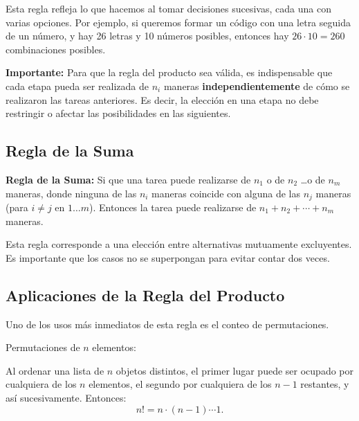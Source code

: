 Esta regla refleja lo que hacemos al tomar decisiones sucesivas, cada una con varias opciones. Por ejemplo, si queremos formar un código con una letra seguida de un número, y hay 26 letras y 10 números posibles, entonces hay $26 \cdot 10 = 260$ combinaciones posibles.

\medskip

\textbf{Importante:} Para que la regla del producto sea válida, es indispensable que cada etapa pueda ser realizada de $n_i$ maneras \textbf{independientemente} de cómo se realizaron las tareas anteriores. Es decir, la elección en una etapa no debe restringir o afectar las posibilidades en las siguientes.



\subsection*{Regla de la Suma}

\begin{definitionblock}{\textbf{Regla de la Suma:}} 
 Si que una tarea puede realizarse de $n_1$ o de $n_2$ \ldots o de $n_m$
  maneras, donde ninguna de las $n_i$ maneras coincide con alguna de las $n_j$
  maneras (para $i \neq j$ en $1\ldots m$). Entonces la tarea puede realizarse
  de $n_1 + n_2 + \cdots + n_m$ maneras.
\end{definitionblock}

Esta regla corresponde a una elección entre alternativas mutuamente excluyentes. Es importante que los casos no se superpongan para evitar contar dos veces.



\subsection{Aplicaciones de la Regla del Producto}

Uno de los usos más inmediatos de esta regla es el conteo de permutaciones.

\begin{exampleblock}{Permutaciones de $n$ elementos:}

Al ordenar una lista de $n$ objetos distintos, el primer lugar puede ser ocupado por cualquiera de los $n$ elementos, el segundo por cualquiera de los $n-1$ restantes, y así sucesivamente. Entonces:
\[
n! = n \cdot (n-1) \cdots 1.
\]
\end{exampleblock}

